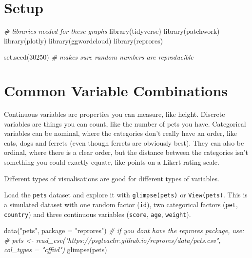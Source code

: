 \documentclass[
  oneside]{book}
\newenvironment{Shaded}{\begin{snugshade}}{\end{snugshade}}
\newcommand{\AttributeTok}[1]{\textcolor[rgb]{0.77,0.63,0.00}{#1}}
\newcommand{\CommentTok}[1]{\textcolor[rgb]{0.56,0.35,0.01}{\textit{#1}}}
\newcommand{\DecValTok}[1]{\textcolor[rgb]{0.00,0.00,0.81}{#1}}
\newcommand{\FunctionTok}[1]{\textcolor[rgb]{0.00,0.00,0.00}{#1}}
\newcommand{\NormalTok}[1]{#1}
\newcommand{\StringTok}[1]{\textcolor[rgb]{0.31,0.60,0.02}{#1}}
\begin{document}
\hypertarget{setup_ggplot}{%
\section{Setup}\label{setup_ggplot}}

\begin{Shaded}
\begin{Highlighting}[]
\CommentTok{\# libraries needed for these graphs}
\FunctionTok{library}\NormalTok{(tidyverse)}
\FunctionTok{library}\NormalTok{(patchwork) }
\FunctionTok{library}\NormalTok{(plotly)}
\FunctionTok{library}\NormalTok{(ggwordcloud)}
\FunctionTok{library}\NormalTok{(reprores)}

\FunctionTok{set.seed}\NormalTok{(}\DecValTok{30250}\NormalTok{) }\CommentTok{\# makes sure random numbers are reproducible}
\end{Highlighting}
\end{Shaded}

\hypertarget{vartypes}{%
\section{Common Variable Combinations}\label{vartypes}}

Continuous variables are properties you can measure, like height. Discrete variables are things you can count, like the number of pets you have. Categorical variables can be nominal, where the categories don't really have an order, like cats, dogs and ferrets (even though ferrets are obviously best). They can also be ordinal, where there is a clear order, but the distance between the categories isn't something you could exactly equate, like points on a Likert rating scale.

Different types of visualisations are good for different types of variables.

Load the \texttt{pets} dataset and explore it with \texttt{glimpse(pets)} or \texttt{View(pets)}. This is a simulated dataset with one random factor (\texttt{id}), two categorical factors (\texttt{pet}, \texttt{country}) and three continuous variables (\texttt{score}, \texttt{age}, \texttt{weight}).

\begin{Shaded}
\begin{Highlighting}[]
\FunctionTok{data}\NormalTok{(}\StringTok{"pets"}\NormalTok{, }\AttributeTok{package =} \StringTok{"reprores"}\NormalTok{)}
\CommentTok{\# if you don\textquotesingle{}t have the reprores package, use:}
\CommentTok{\# pets \textless{}{-} read\_csv("https://psyteachr.github.io/reprores/data/pets.csv", col\_types = "cffiid")}
\FunctionTok{glimpse}\NormalTok{(pets)}
\end{Highlighting}
\end{Shaded}
\end{document}
